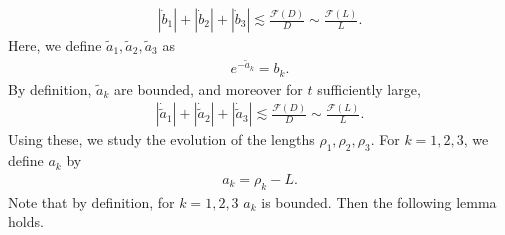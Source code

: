 \documentclass[reqno]{amsart}
\theoremstyle{plain}
\theoremstyle{definition}
\numberwithin{equation}{section}
\newcommand{\1}{\mathbbm{1}}
\begin{document}
\begin{align}\label{bkes2}
|\dot{b}_1|+|\dot{b}_2|+|\dot{b}_3|\lesssim \frac{\mathcal{F}(D)}{D}\sim \frac{\mathcal{F}(L)}{L}.
\end{align}
Here, we define $\tilde{a}_1,\tilde{a}_2, \tilde{a}_3$ as 
\begin{align}\label{tildeadef}
e^{-\tilde{a}_k}=b_k.
\end{align}
By definition, $\tilde{a}_k$ are bounded, and moreover for $t$ sufficiently large,
\begin{align}\label{tildeaes1}
|\dot{\tilde{a}}_1|+|\dot{\tilde{a}}_2|+|\dot{\tilde{a}}_3|\lesssim \frac{\mathcal{F}(D)}{D}\sim \frac{\mathcal{F}(L)}{L}.
\end{align}
Using these, we study the evolution of the lengths $\rho_1,\rho_2,\rho_3$. For $k=1,2,3$, we define $a_k$ by
\begin{align}\label{akdef}
a_k=\rho_k-L.
\end{align}
Note that by definition, for $k=1,2,3$ $a_k$ is bounded. Then the following lemma holds.
\end{document}
